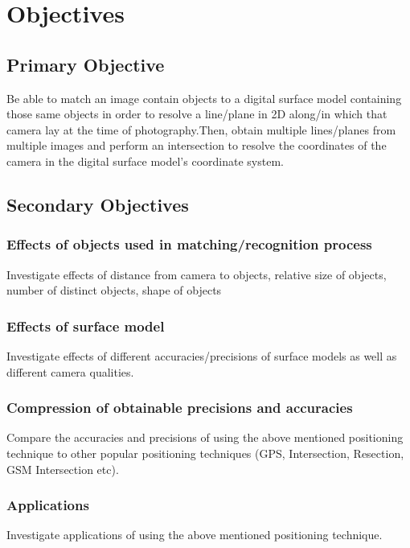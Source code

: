 

\section{Objectives}
\subsection{Primary Objective}
Be able to match an image contain objects to a digital surface model containing those same objects in order to resolve a line/plane in 2D along/in which that camera lay at the time of photography.Then, obtain multiple lines/planes from multiple images and perform an intersection to resolve the coordinates of the camera in the digital surface model's coordinate system.

\subsection{Secondary Objectives}

\subsubsection{Effects of objects used in matching/recognition process}
Investigate effects of distance from camera to objects, relative size of objects, number of distinct objects, shape of objects

\subsubsection{Effects of surface model}
Investigate effects of different accuracies/precisions of surface models as well as different camera qualities.

\subsubsection{Compression of obtainable precisions and accuracies}
Compare the accuracies and precisions of using the above mentioned positioning technique to other popular positioning techniques (GPS, Intersection, Resection, GSM Intersection etc).

\subsubsection{Applications}
Investigate applications of using the above mentioned positioning technique.